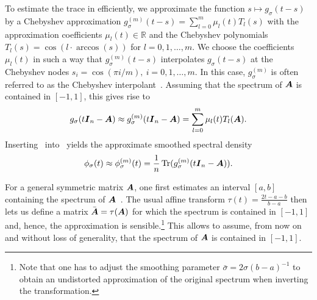 To estimate the trace in  efficiently, we approximate the function 
$s\mapsto g_{\sigma}(t- s)$ by a
Chebyshev approximation $g_{\sigma}^{(m)}(t-s) = 
\sum_{l=0}^{m} \mu_l(t) T_l(s)$
with the approximation coefficients $\mu_l(t) \in \mathbb R$ and the Chebyshev polynomials
$T_l(s) = \cos(l \cdot \arccos(s))$ for $l = 0,1,\ldots,m$. We choose the coefficients $\mu_l(t)$ in such a way that $g_{\sigma}^{(m)}(t-s)$ interpolates $g_{\sigma}(t-s)$ at the Chebyshev nodes $s_i = \cos(\pi i / m),~i=0,1,\dots,m$. In this case, $g_{\sigma}^{(m)}$ is often referred to as the Chebyshev interpolant~\cite[Chapter 2]{trefethen-2020-approximation-theory}.
Assuming that the spectrum of $\boldsymbol{A}$ is contained in $[-1,1]$, this gives rise to
\begin{equation}
    g_{\sigma}(t\boldsymbol{I}_n - \boldsymbol{A}) \approx g_{\sigma}^{(m)}(t\boldsymbol{I}_n - \boldsymbol{A}) = \sum_{l=0}^{m} \mu_l(t) T_l(\boldsymbol{A}).
    \label{equ:matrix-approximation}
\end{equation}
Inserting~ into~ yields the approximate smoothed spectral density
\begin{equation}
    \phi_{\sigma}(t) \approx \phi_{\sigma}^{(m)}(t) =  \frac{1}{n} \operatorname{Tr}(g_{\sigma}^{(m)}(t \boldsymbol{I}_n - \boldsymbol{A})).
    \label{equ:expanded-spectral-density}
\end{equation}
\begin{remark}
For a general symmetric matrix $\boldsymbol{A}$, one first estimates an interval $[a,b]$ containing the spectrum of $\boldsymbol{A}$~\cite{zhou-2011-bounding-spectrum}. The usual affine transform
$\tau(t) = \frac{2t - a - b}{b - a}$
then lets us define a matrix $\bar{\boldsymbol{A}} = \tau(\boldsymbol{A})$ for which the spectrum is contained in $[-1, 1]$ and, hence, the approximation  is sensible.\footnote{Note that one has to adjust the smoothing parameter $\bar{\sigma} = 2 \sigma (b - a)^{-1}$ to obtain an undistorted approximation of the original spectrum when inverting the transformation.} This allows to assume, from now on and without loss of generality, that the spectrum of $\boldsymbol{A}$ is contained in $[-1, 1]$.
\end{remark}


